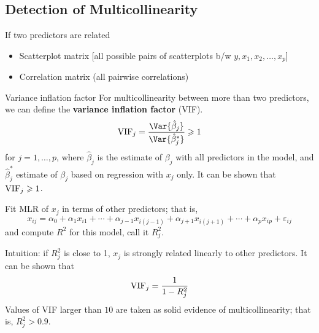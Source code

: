 \subsection{Detection of Multicollinearity}
If two predictors are related
\begin{itemize}
    \item Scatterplot matrix [all possible pairs of
                  scatterplots b/w $ y,x_1,x_2,\ldots,x_p $]
    \item Correlation matrix (all pairwise correlations)
\end{itemize}
\begin{Definition}{Variance inflation factor}{}
    For multicollinearity between more than two
    predictors, we can define the \textbf{variance inflation factor}
    (VIF).
    \[ \VIF_j=\frac{\Var{\hat{\beta}_j}}{\Var{\hat{\beta}_j^*}}\geqslant 1 \]
    for $ j=1,\ldots,p $,
    where $ \hat{\beta}_j $ is the estimate of $ \beta_j $ with all predictors
    in the model, and $ \hat{\beta}_j^* $ estimate
    of $ \beta_j $ based on regression with $ x_j $ only.
    It can be shown that $ \operatorname{VIF}_j\geqslant 1 $.
\end{Definition}
Fit MLR of $ x_j $ in terms of other predictors;
that is,
\[ x_{ij}=\alpha_0+\alpha_1x_{i1}+\cdots+\alpha_{j-1}x_{i(j-1)}+
    \alpha_{j+1}x_{i(j+1)}+\cdots+\alpha_p x_{ip}+\varepsilon_{ij} \]
and compute $ R^2 $ for this model, call it $ R_j^2 $.

Intuition: if $ R_j^2 $ is close to 1, $ x_j $ is strongly
related linearly to other predictors. It can be shown that
\[ \operatorname{VIF}_j=\frac{1}{1-R_j^2}  \]
Values of VIF
larger than $ 10 $ are taken as solid evidence of multicollinearity;
that is, $ R_j^2>0.9 $.
